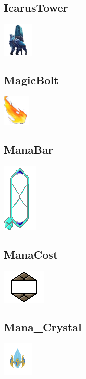 \documentclass[a4paper,12pt]{scrartcl}
\begin{document}
	\subsection{IcarusTower}
	\begin{center}\includegraphics{Prog2_EA_V2/Art/IcarusTower.png}\end{center}
	\subsection{MagicBolt}
	\begin{center}\includegraphics{Prog2_EA_V2/Art/MagicBolt.png}\end{center}
	\subsection{ManaBar}
	\begin{center}\includegraphics{Prog2_EA_V2/Art/ManaBar.png}\end{center}
	\subsection{ManaCost}
	\begin{center}\includegraphics{Prog2_EA_V2/Art/ManaCost.png}\end{center}
	\subsection{Mana\_Crystal}
	\begin{center}\includegraphics{Prog2_EA_V2/Art/Mana_Crystal.png}\end{center}
\end{document}
